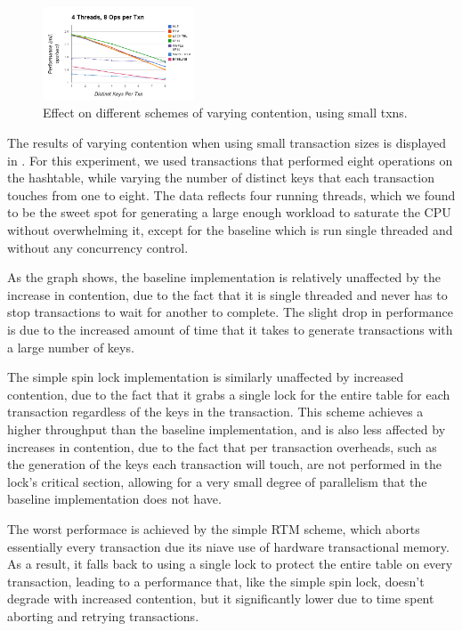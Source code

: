 \begin{figure}[h!]
  \centering
  \includegraphics[width=0.4\textwidth]{figure/small_txns.png}
  \caption{Effect on different schemes of varying contention, using small txns.}
  \label{fig:small_txns} 
\end{figure}

The results of varying contention when using small transaction sizes is 
displayed in . For this experiment, we used transactions 
that performed eight operations on the hashtable, while varying the number of 
distinct keys that each transaction touches from one to eight. The data 
reflects four running threads, which we found to be the sweet spot for 
generating a large enough workload to saturate the CPU without overwhelming it, 
except for the baseline which is run single threaded and without any 
concurrency control.

As the graph shows, the baseline implementation is relatively unaffected by the 
increase in contention, due to the fact that it is single threaded and never has 
to stop transactions to wait for another to complete. The slight drop in 
performance is due to the increased amount of time that it takes to generate 
transactions with a large number of keys.

The simple spin lock implementation is similarly unaffected by increased 
contention, due to the fact that it grabs a single lock for the entire table 
for each transaction regardless of the keys in the transaction. This scheme 
achieves a higher throughput than the baseline implementation, and is also less 
affected by increases in contention, due to the fact that per transaction 
overheads, such as the generation of the keys each transaction will touch, 
are not performed in the lock's critical section, allowing for a very small 
degree of parallelism that the baseline implementation does not have.

The worst performace is achieved by the simple RTM scheme, which aborts 
essentially every transaction due its niave use of hardware transactional memory. 
As a result, it falls back to using a single lock to protect the entire table on 
every transaction, leading to a performance that, like the simple spin lock, 
doesn't degrade with increased contention, but it significantly lower due to 
time spent aborting and retrying transactions.

